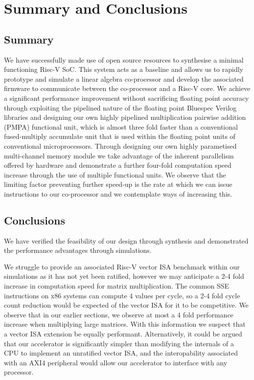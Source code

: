 \documentclass[a4paper,8pt]{report}
\begin{document}
\chapter{Summary and Conclusions} 
\section{Summary}
We have successfully made use of open source resources to synthesise a minimal
functioning Risc-V SoC. This system acts as a baseline and allows us to rapidly
prototype and simulate a linear algebra co-processor and develop the associated
firmware to communicate between the co-processor and a Risc-V core. We achieve
a significant performance improvement without sacrificing floating point
accuracy through exploiting the pipelined nature of the floating point Bluespec
Verilog libraries and designing our own highly pipelined multiplication pairwise
addition (PMPA) functional unit, which is almost three fold faster than a
conventional fused-multiply accumulate unit that is used within the floating
point units of conventional microprocessors. Through designing our own highly
parametised multi-channel memory module we take advantage of the inherent
parallelism offered by hardware and demonstrate a further four-fold computation
speed increase through the use of multiple functional units. We observe that the
limiting factor preventing further speed-up is the rate at which we can issue
instructions to our co-processor and we contemplate ways of increasing this.

\section{Conclusions}
We have verified the feasibility of our design through synthesis and
demonstrated the performance advantages through simulations.

We struggle to provide an associated Risc-V vector ISA benchmark within our
simulations as it has not yet been ratified, however we may anticipate a 2-4
fold increase in computation speed for matrix multiplication. The common SSE
instructions on x86 systems can compute 4 values per cycle, so a 2-4 fold cycle
count reduction would be expected of the vector ISA for it to be competitive.
We observe that in our earlier sections, we observe at most a 4 fold performance
increase when multiplying large matrices. With this information we suspect that
a vector ISA extension be equally performant. Alternatively, it could be argued
that our accelerator is significantly simpler than modifying the internals of a
CPU to implement an unratified vector ISA, and the interopability associated
with an AXI4 peripheral would allow our accelerator to interface with any
processor.
\end{document}
